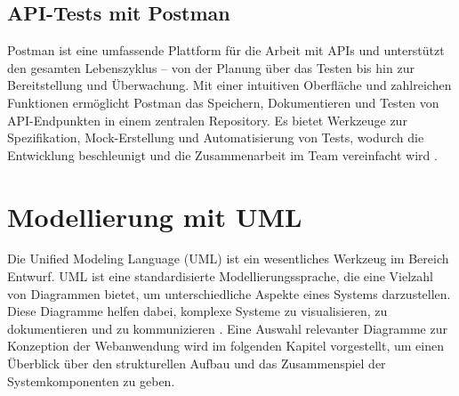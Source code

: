 \subsection{API-Tests mit Postman}

Postman ist eine umfassende Plattform für die Arbeit mit APIs und unterstützt den gesamten Lebenszyklus – von der Planung über das Testen bis hin zur Bereitstellung und Überwachung. Mit einer intuitiven Oberfläche und zahlreichen Funktionen ermöglicht Postman das Speichern, Dokumentieren und Testen von API-Endpunkten in einem zentralen Repository. Es bietet Werkzeuge zur Spezifikation, Mock-Erstellung und Automatisierung von Tests, wodurch die Entwicklung beschleunigt und die Zusammenarbeit im Team vereinfacht wird \cite{POSTMAN2025}.

\section{Modellierung mit UML}

Die Unified Modeling Language (UML) ist ein wesentliches Werkzeug im Bereich Entwurf. UML ist eine standardisierte Modellierungssprache, die eine Vielzahl von Diagrammen bietet, um unterschiedliche Aspekte eines Systems darzustellen. Diese Diagramme helfen dabei, komplexe Systeme zu visualisieren, zu dokumentieren und zu kommunizieren \cite{UML2025}. Eine Auswahl relevanter Diagramme zur Konzeption der Webanwendung wird im folgenden Kapitel vorgestellt, um einen Überblick über den strukturellen Aufbau und das Zusammenspiel der Systemkomponenten zu geben.


                                                                                                                                                                                                                                                                                        